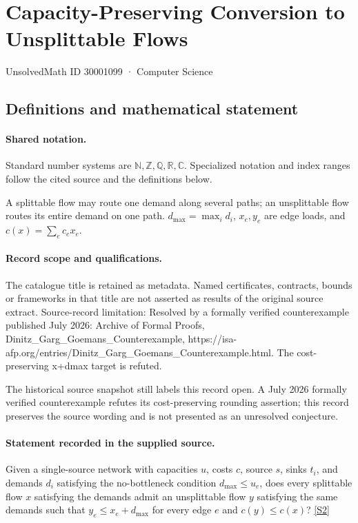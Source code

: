 \documentclass[11pt]{article}
\newcommand{\sref}[2]{\hyperlink{source:#1:#2}{[S#2]}}
\begin{document}
\setcounter{section}{30001098}
\section{Capacity-Preserving Conversion to Unsplittable Flows}\label{30001099}
{\small\sffamily UnsolvedMath ID 30001099 · Computer Science}
\subsection{Definitions and mathematical statement}

\paragraph{Shared notation.}Standard number systems are $\mathbb N,\mathbb Z,\mathbb Q,\mathbb R,\mathbb C$. Specialized notation and index ranges follow the cited source and the definitions below.


A splittable flow may route one demand along several paths; an unsplittable flow routes its entire demand on one path. $d_{\max}=\max_i d_i$, $x_e,y_e$ are edge loads, and $c(x)=\sum_e c_e x_e$.
\paragraph{Record scope and qualifications.}
The catalogue title is retained as metadata. Named certificates, contracts, bounds or frameworks in that title are not asserted as results of the original source extract.
Source-record limitation: Resolved by a formally verified counterexample published July 2026: Archive of Formal Proofs, Dinitz_Garg_Goemans_Counterexample, https://isa-afp.org/entries/Dinitz_Garg_Goemans_Counterexample.html. The cost-preserving x+dmax target is refuted.

The historical source snapshot still labels this record open. A July 2026 formally verified counterexample refutes its cost-preserving rounding assertion; this record preserves the source wording and is not presented as an unresolved conjecture.
\paragraph{Statement recorded in the supplied source.}
Given a single-source network with capacities $u$, costs $c$, source $s$, sinks $t_i$, and demands $d_i$ satisfying the no-bottleneck condition $d_{\max}\leq u_e$, does every splittable flow $x$ satisfying the demands admit an unsplittable flow $y$ satisfying the same demands such that $y_e\leq x_e+d_{\max}$ for every edge $e$ and $c(y)\leq c(x)$? \sref{30001099}{2}
\end{document}
